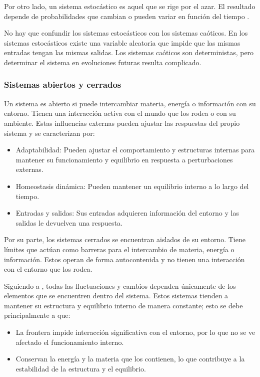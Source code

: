 Por otro lado, un sistema estocástico es aquel que se rige por el azar. El resultado depende de probabilidades que cambian o pueden variar en función del tiempo \cite{probabilistico}.

No hay que confundir los sistemas estocásticos con los sistemas caóticos. En los sistemas estocásticos existe una variable aleatoria que impide que las mismas entradas tengan las mismas salidas. Los sistemas caóticos son deterministas, pero determinar el sistema en evoluciones futuras resulta complicado. 

\subsubsection{Sistemas abiertos y cerrados}

Un sistema es abierto si puede intercambiar materia, energía o información con su entorno. Tienen una interacción activa con el mundo que los rodea o con su ambiente. Estas influencias externas pueden ajustar las respuestas del propio sistema y se caracterizan por:

\begin{itemize}
	
	\item Adaptabilidad: Pueden ajustar el comportamiento y estructuras internas para mantener su funcionamiento y equilibrio en respuesta a perturbaciones externas.
	
	\item Homeostasis dinámica: Pueden mantener un equilibrio interno a lo largo del tiempo.
	
	
	
	\item Entradas y salidas: Sus entradas adquieren información del entorno y las salidas le devuelven una respuesta.
	
\end{itemize}

Por su parte, los sistemas cerrados se encuentran aislados de su entorno. Tiene límites que actúan como barreras para el intercambio de materia, energía o información. Estos operan de forma autocontenida y no tienen una interacción con el entorno que los rodea.

Siguiendo a \cite{tgs}, todas las fluctuaciones y cambios dependen únicamente de los elementos que se encuentren dentro del sistema. Estos sistemas tienden a mantener su estructura y equilibrio interno de manera constante; esto se debe principalmente a que:

\begin{itemize}
	
	\item La frontera impide interacción significativa con el entorno, por lo que no se ve afectado el funcionamiento interno.
	
	\item Conservan la energía y la materia que los contienen, lo que contribuye a la estabilidad de la estructura y el equilibrio.
	
\end{itemize}

